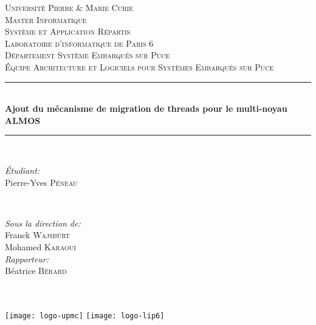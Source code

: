 \begin{titlepage}

\newcommand{\HRule}{\rule{\linewidth}{0.44mm}}
\center


\textsc{\LARGE Université Pierre \& Marie Curie}\\[0.44cm]
\textsc{\Large Master Informatique}\\[0.44cm]
\textsc{\large Système et Application Répartis}\\[1.44cm]

\textsc{\LARGE Laboratoire d'informatique de Paris 6}\\[0.44cm]
\textsc{\Large Département Système Embarqués sur Puce}\\[0.44cm]
\textsc{\large Équipe Architecture et Logiciels pour Systèmes Embarqués sur
  Puce}\\[1.44cm]

\HRule \\[0.4cm] { \huge
  \bfseries Ajout du mécanisme de migration de threads pour le multi-noyau
  ALMOS}\\[0.4cm]
\HRule \\[1.44cm]


\begin{minipage}{0.4\textwidth}
\begin{flushleft} \large
\emph{Étudiant:}\\ Pierre-Yves \textsc{Péneau}
\end{flushleft}
\end{minipage}
~
\begin{minipage}{0.4\textwidth}
\begin{flushright} \large
  \emph{Sous la direction de:} \\ Franck \textsc{Wajsbürt}\\ Mohamed
  \textsc{Karaoui}\\\vspace{1.44cm} \emph{Rapporteur:} \\ Béatrice
  \textsc{Bérard}
\end{flushright}
\end{minipage}\\[2cm]


\\[1cm]


\texttt{[image: logo-upmc]}\hspace{3cm}
\texttt{[image: logo-lip6]}\\[1cm]
\vfill

\end{titlepage}
